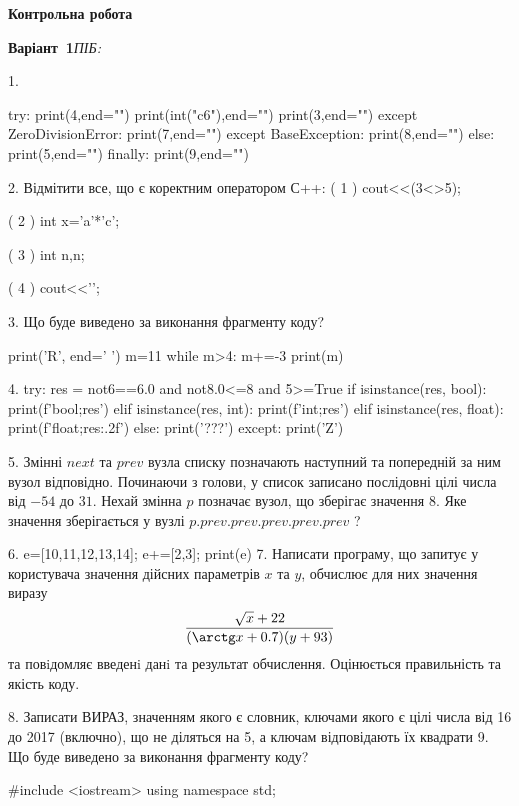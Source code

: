 \documentclass[11pt]{article}
\begin{document}
{\large\textbf{Контрольна робота}}

\textbf{Варіант \No\,1}\hfill \textit{ПІБ:}\,\underline{\hspace{60mm}}
\vspace{4mm}

1. 

try:
    print(4,end="")
    print(int("c6"),end="")
    print(3,end="")
except ZeroDivisionError: print(7,end="")
except BaseException: print(8,end="")
else: print(5,end="")
finally: print(9,end="")

2. %
Відмітити все, що є коректним оператором С++:
( 1 ) cout<<(3<>5);

( 2 ) int x='a'*'c';

( 3 ) int n,n;

( 4 ) cout<<'\n';

3. Що буде виведено за виконання фрагменту коду?

print('R', end=' ')
m=11
while m>4:
    m+=-3
print(m)


4. 
try:
    res = not6==6.0 and not8.0<=8 and 5>=True
    if isinstance(res, bool):
        print(f'bool;{res}')
    elif isinstance(res, int):
        print(f'int;{res}')
    elif isinstance(res, float):
        print(f'float;{res:.2f}')
    else:
        print('???')
except:
    print('Z')

5. 
Змінні $next$ та $prev$ вузла списку позначають наступний та попередній за ним вузол відповідно. Починаючи з голови, у список записано послідовні цілі числа від $-54$ до $31$. Нехай змінна $p$ позначає вузол, що зберігає значення $8$.
Яке значення зберігається у вузлі $p.prev.prev.prev.prev.prev$ ?

6. 
e=[10,11,12,13,14]; e+=[2,3]; print(e)
7. 
Написати програму, що запитує у користувача значення дійсних параметрів $x$ та $y$, обчислює для них значення виразу 
$$\frac{\sqrt x + 22}{(\arctg x + 0.7) (y + 93)}$$ 
та повiдомляє введенi данi та результат обчислення.
 Оцінюється правильність та якість коду.


8. 
Записати ВИРАЗ, значенням якого є словник, ключами якого є цілі числа від 16 до 2017 (включно), що не діляться на 5, а ключам відповідають їх квадрати 
9. Що буде виведено за виконання фрагменту коду?

#include <iostream>
using namespace std;
\end{document}
